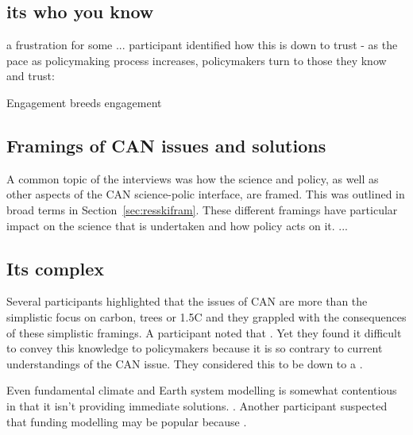 \subsection{its who you know}
a frustration for some ...
participant identified how this is down to trust - as the pace as policymaking process increases, policymakers turn to those they know and trust: 

Engagement breeds engagement

\subsection{Framings of CAN issues and solutions}
A common topic of the interviews was how the science and policy, as well as other aspects of the CAN science-polic interface, are framed. This was outlined in broad terms in Section~\ref{sec:resskifram}. These different framings have particular impact on the science that is undertaken and how policy acts on it. ...

\subsection{Its complex}
Several participants highlighted that the issues of CAN are more than the simplistic focus on carbon, trees or 1.5\degree C and they grappled with the consequences of these simplistic framings. A participant noted that . Yet they found it difficult to convey this knowledge to policymakers because it is so contrary to current understandings of the CAN issue. They considered this to be down to a . 

Even fundamental climate and Earth system modelling is somewhat contentious in that it isn't providing immediate solutions. . Another participant suspected that funding modelling may be popular because .


